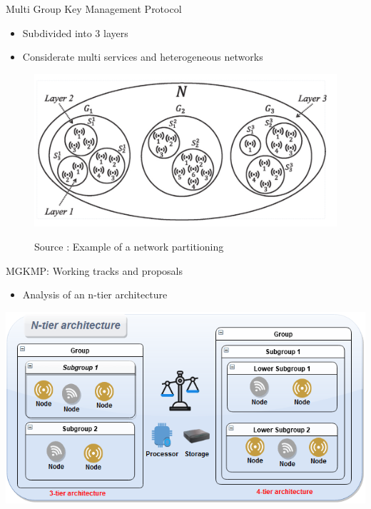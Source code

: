 \documentclass{beamer}
\begin{document}
\begin{frame}{Multi Group Key Management Protocol}
	\begin{itemize}
		\item Subdivided into 3 layers
		\item Considerate multi services and heterogeneous networks
	\end{itemize}
	\vfill
	\centering
	\begin{figure}
		\centering
		\includegraphics[scale=0.40]{figures/mgkmp/mgkmp_layers.png}\\
		\caption{Source \cite{kandi_versatile_2020}: Example of a network partitioning}
	\end{figure}
\end{frame}

\begin{frame}{MGKMP: Working tracks and proposals}
	\begin{itemize}
		\item Analysis of an n-tier architecture
	\end{itemize}
	\vfill
	\centering
	\includegraphics[scale=0.37]{figures/mgkmp/n-tier.png}
\end{frame}
\end{document}
